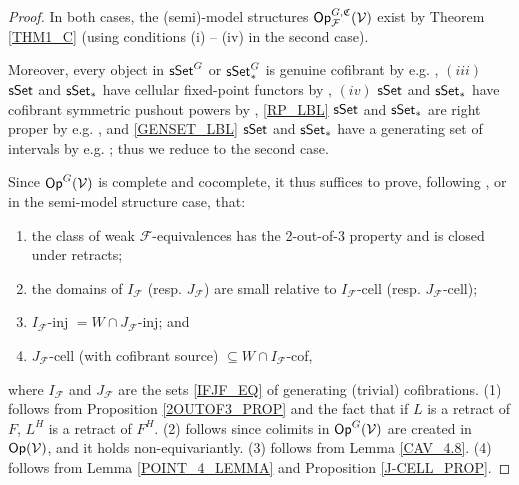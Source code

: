 \documentclass[a4paper,10pt
,draft
]{article}%
\renewcommand{\F}{\mathcal F}
\renewcommand{\1}{\eta}%
\begin{document}
\begin{proof}
      In both cases, the (semi)-model structures $\Op_\F^{G, \mathfrak C}(\V)$ exist by Theorem \ref{THM1_C}
      (using conditions (i) -- (iv) in the second case).
      
      Moreover,
      every object in $\mathsf{sSet}^G$ or $\sSet^G_{\**}$ is genuine cofibrant by e.g. \cite[Remark 5.71]{BP_geo},
      $(iii)$ $\mathsf{sSet}$ and $\sSet_{\**}$ have cellular fixed-point functors by \cite[Example 2.14]{Ste16},
      $(iv)$ $\mathsf{sSet}$ and $\sSet_{\**}$ have cofibrant symmetric pushout powers by \cite[Remark 6.18]{BP_geo},
      \ref{RP_LBL} $\mathsf{sSet}$ and $\sSet_{\**}$ are right proper by e.g. \cite[Thm. 2.1.1 and Prop 4.1.1]{JT_simp},
      and
      \ref{GENSET_LBL} $\mathsf{sSet}$ and $\sSet_{\**}$ have a generating set of intervals
      by e.g. \cite[Lemma 1.12]{BM13};
      thus we reduce to the second case.
      
      Since $\mathsf{Op}^G(\mathcal V)$ is complete and cocomplete, it thus suffices to prove,
      following \cite[Theorem 2.1.19]{Hov}, or \cite[Theorem 2.2.2]{WY} in the semi-model structure case, that:
      \begin{enumerate}[label = (\arabic*)]
      \item the class of weak $\F$-equivalences has the 2-out-of-3 property and is closed under retracts;
      \item the domains of $I_{\F}$ (resp. $J_{\F}$) are small relative to $I_{\F}$-cell (resp. $J_{\F}$-cell);
      \item $I_{\F}$-inj $= W\cap J_{\F}$-inj; and
      \item $J_{\F}$-cell (with cofibrant source) $\subseteq W\cap I_{\F}$-cof,
      \end{enumerate}
      where $I_\F$ and $J_\F$ are the sets \eqref{IFJF_EQ} of generating (trivial) cofibrations.
      (1) follows from Proposition \ref{2OUTOF3_PROP} and the fact that if $L$ is a retract of $F$, $L^H$ is a retract of $F^H$.
      (2) follows since colimits in $\mathsf{Op}^G(\mathcal V)$ are created in $\mathsf{Op}(\mathcal V)$, and it holds non-equivariantly.
      (3) follows from Lemma \ref{CAV_4.8}.
      (4) follows from Lemma \ref{POINT_4_LEMMA} and Proposition \ref{J-CELL_PROP}.
\end{proof}
\end{document}
